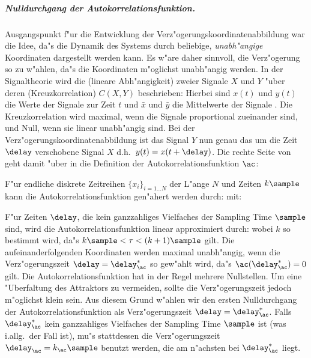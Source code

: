 \subparagraph{Nulldurchgang der Autokorrelationsfunktion.} Ausgangspunkt f"ur die
Entwicklung der Verz"ogerungskoordinatenabbildung war die Idee, da"s die Dynamik des
Systems durch beliebige, \emph{unabh"angige} Koordinaten dargestellt werden kann. Es w"are
daher sinnvoll, die Verz"ogerung so zu w"ahlen, da"s die Koordinaten m"oglichst
unabh"angig werden. In der Signaltheorie wird die \begriff(lineare Abh"angigkeit) zweier
Signale $X$ und $Y$ "uber deren \begriff(Kreuzkorrelation) $C(X,Y)$ beschrieben:
Hierbei sind $x(t)$ und $y(t)$ die Werte der Signale zur
Zeit $t$ und $\bar x$ und $\bar y$ die Mittelwerte der Signale \footnotemark. Die
Kreuzkorrelation wird maximal, wenn die Signale proportional zueinander sind, und Null,
wenn sie linear unabh"angig sind. Bei der Verz"ogerungskoordinatenabbildung ist das Signal
$Y$ nun genau das um die Zeit $\delay$ verschobene Signal $X$ d.h.\  $y(t)=x(t+\delay)$.
Die rechte Seite von  geht damit "uber in die Definition der
Autokorrelationsfunktion $\ac$:

F"ur endliche diskrete Zeitreihen $\{x_i\}_{i=1\dots N}$ der L"ange $N$ und Zeiten
$k\sample$ kann die Autokorrelationsfunktion gen"ahert werden durch:
mit:

F"ur Zeiten $\delay$, die kein ganzzahliges Vielfaches der Sampling Time $\sample$ sind,
wird die Autokorrelationsfunktion linear approximiert durch:
wobei $k$ so bestimmt wird, da"s $k\sample<\tau<(k+1)\sample$ gilt.  Die
aufeinanderfolgenden Koordinaten werden maximal unabh"angig, wenn die Verz"ogerungszeit
$\delay=\delay_\ac^*$ so gew"ahlt wird, da"s $\ac(\delay_\ac^*)=0$ gilt.  Die
Autokorrelationsfunktion hat in der Regel mehrere Nullstellen. Um eine "Uberfaltung des
Attraktors zu vermeiden, sollte die Verz"ogerungszeit jedoch m"oglichst klein sein.  Aus
diesem Grund w"ahlen wir den ersten Nulldurchgang der Autokorrelationsfunktion als
Verz"ogerungszeit $\delay=\delay_\ac^*$.  Falls $\delay_\ac^*$ kein ganzzahliges Vielfaches
der Sampling Time $\sample$ ist (was i.allg.\  der Fall ist), mu"s stattdessen die Verz"ogerungszeit
$\delay_\ac=k_\ac\sample$ benutzt werden, die am n"achsten bei $\delay_\ac^*$ liegt.


